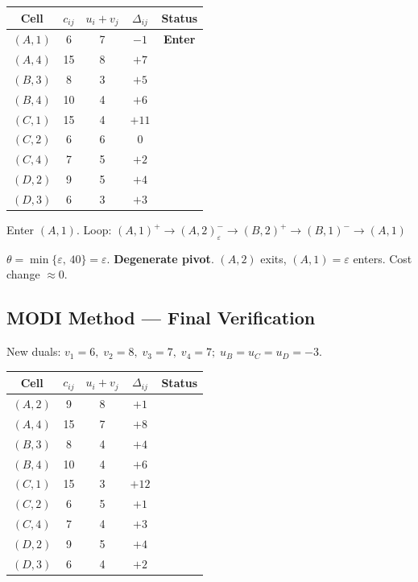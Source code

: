 \documentclass[12pt]{article}
\begin{document}
\begin{center}
\renewcommand{\arraystretch}{1.3}
\begin{tabular}{|c|c|c|c|c|}
  \hline
  \rowcolor{primary}
  {\color{white}\textbf{Cell}} &
  {\color{white}$c_{ij}$} &
  {\color{white}$u_i+v_j$} &
  {\color{white}$\Delta_{ij}$} &
  {\color{white}\textbf{Status}} \\
  \hline
  \rowcolor{red!15} $(A,1)$ & 6 & 7 & $-1$ & \textbf{Enter} \\
  \hline
  $(A,4)$ & 15 & 8 & $+7$ & \\
  \hline
  $(B,3)$ & 8 & 3 & $+5$ & \\
  \hline
  $(B,4)$ & 10 & 4 & $+6$ & \\
  \hline
  $(C,1)$ & 15 & 4 & $+11$ & \\
  \hline
  $(C,2)$ & 6 & 6 & $0$ & \\
  \hline
  $(C,4)$ & 7 & 5 & $+2$ & \\
  \hline
  $(D,2)$ & 9 & 5 & $+4$ & \\
  \hline
  $(D,3)$ & 6 & 3 & $+3$ & \\
  \hline
\end{tabular}
\end{center}

Enter $(A,1)$. Loop: $(A,1)^{+} \to (A,2)^{-}_\varepsilon \to (B,2)^{+} \to (B,1)^{-} \to (A,1)$

$\theta = \min\{\varepsilon,\,40\} = \varepsilon$. \textbf{Degenerate pivot}. $(A,2)$ exits, $(A,1)=\varepsilon$ enters. Cost change $\approx 0$.

\subsection*{MODI Method --- Final Verification}

New duals: $v_1=6,\; v_2=8,\; v_3=7,\; v_4=7;\; u_B=u_C=u_D=-3$.

\begin{center}
\renewcommand{\arraystretch}{1.3}
\begin{tabular}{|c|c|c|c|c|}
  \hline
  \rowcolor{primary}
  {\color{white}\textbf{Cell}} &
  {\color{white}$c_{ij}$} &
  {\color{white}$u_i+v_j$} &
  {\color{white}$\Delta_{ij}$} &
  {\color{white}\textbf{Status}} \\
  \hline
  $(A,2)$ & 9 & 8 & $+1$ & \\
  \hline
  $(A,4)$ & 15 & 7 & $+8$ & \\
  \hline
  $(B,3)$ & 8 & 4 & $+4$ & \\
  \hline
  $(B,4)$ & 10 & 4 & $+6$ & \\
  \hline
  $(C,1)$ & 15 & 3 & $+12$ & \\
  \hline
  $(C,2)$ & 6 & 5 & $+1$ & \\
  \hline
  $(C,4)$ & 7 & 4 & $+3$ & \\
  \hline
  $(D,2)$ & 9 & 5 & $+4$ & \\
  \hline
  $(D,3)$ & 6 & 4 & $+2$ & \\
  \hline
\end{tabular}
\end{center}
\end{document}
